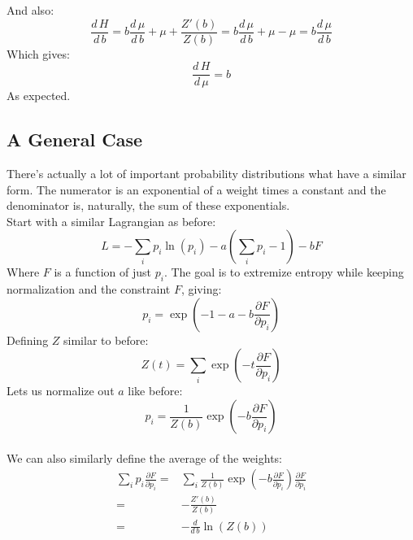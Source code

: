 And also:
\[\frac{d\,H}{d\,b} = b\frac{d\,\mu}{d\,b}+\mu+\frac{Z'(b)}{Z(b)} = b\frac{d\,\mu}{d\,b}+\mu -\mu =b\frac{d\,\mu}{d\,b}\]
Which gives:
\[\frac{d\, H}{d\, \mu} = b\]
As expected.

\subsection{A General Case}
There's actually a lot of important probability distributions what have a similar form.
The numerator is an exponential  of a weight times a constant and the denominator is,
naturally, the sum of these exponentials.
\\

Start with a similar Lagrangian as before:
\[ L = -\sum_ip_i\ln(p_i)-a\left(\sum_i p_i - 1\right) - bF\]
Where $F$ is a function of just $p_i$.
The goal is to extremize entropy while keeping normalization and the constraint $F$,
giving:
\[p_i = \exp\left(-1-a-b\frac{\partial F}{\partial p_i}\right)\]
Defining $Z$ similar to before:
\[Z(t) = \sum_i\exp\left(-t\frac{\partial F}{\partial p_i}\right)\]
Lets us normalize out $a$ like before:
\[p_i = \frac{1}{Z(b)}\exp\left(-b\frac{\partial F}{\partial p_i}\right)\]
\\

We can also similarly define the average of the weights:
\begin{equation*}
\begin{aligned}
	\sum_ip_i\frac{\partial F}{\partial p_i} =&
	\sum_i\frac{1}{Z(b)}\exp\left(-b\frac{\partial F}{\partial p_i}\right)\frac{\partial F}{\partial p_i}\\
	=&-\frac{Z'(b)}{Z(b)}\\
	=&-\frac{d}{d\,b}\ln(Z(b))
\end{aligned}
\end{equation*}

